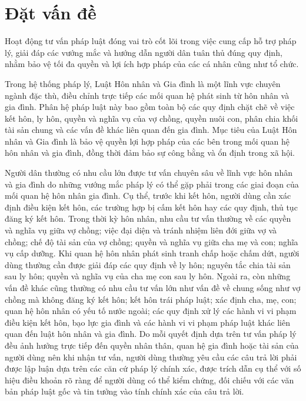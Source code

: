 \documentclass[../DoAn.tex]{subfiles}
\begin{document}
\section{Đặt vấn đề}
\label{section:1.1}


Hoạt động tư vấn pháp luật đóng vai trò cốt lõi trong việc cung cấp hỗ trợ pháp lý, giải đáp các vướng mắc và hướng dẫn người dân tuân thủ đúng quy định, nhằm bảo vệ tối đa quyền và lợi ích hợp pháp của các cá nhân cũng như tổ chức.


Trong hệ thống pháp lý, Luật Hôn nhân và Gia đình là một lĩnh vực chuyên ngành đặc thù, điều chỉnh trực tiếp các mối quan hệ phát sinh từ hôn nhân và gia đình. Phân hệ pháp luật này bao gồm toàn bộ các quy định chặt chẽ về việc kết hôn, ly hôn, quyền và nghĩa vụ của vợ chồng, quyền nuôi con, phân chia khối tài sản chung và các vấn đề khác liên quan đến gia đình. Mục tiêu của Luật Hôn nhân và Gia đình là bảo vệ quyền lợi hợp pháp của các bên trong mối quan hệ hôn nhân và gia đình, đồng thời đảm bảo sự công bằng và ổn định trong xã hội.


Người dân thường có nhu cầu lớn được tư vấn chuyên sâu về lĩnh vực hôn nhân và gia đình do những vướng mắc pháp lý có thể gặp phải trong các giai đoạn của mối quan hệ hôn nhân gia đình. Cụ thể, trước khi kết hôn, người dùng cần xác định điều kiện kết hôn, các trường hợp bị cấm kết hôn hay các quy định, thủ tục đăng ký kết hôn. Trong thời kỳ hôn nhân, nhu cầu tư vấn thường về các quyền và nghĩa vụ giữa vợ chồng; việc đại diện và tránh nhiệm liên đới giữa vợ và chồng; chế độ tài sản của vợ chồng; quyền và nghĩa vụ giữa cha mẹ và con; nghĩa vụ cấp dưỡng. Khi quan hệ hôn nhân phát sinh tranh chấp hoặc chấm dứt, người dùng thường cần được giải đáp các quy định về ly hôn; nguyên tắc chia tài sản sau ly hôn; quyền và nghĩa vụ của cha mẹ con sau ly hôn. Ngoài ra, còn những vấn đề khác cũng thường có nhu cầu tư vấn lớn như vấn đề về chung sống như vợ chồng mà không đăng ký kết hôn; kết hôn trái pháp luật; xác định cha, mẹ, con; quan hệ hôn nhân có yếu tố nước ngoài; các quy định xử lý các hành vi vi phạm điều kiện kết hôn, bạo lực gia đình và các hành vi vi phạm pháp luật khác liên quan đến luật hôn nhân và gia đình. Do mỗi quyết định dựa trên tư vấn pháp lý đều ảnh hưởng trực tiếp đến quyền nhân thân, quan hệ gia đình hoặc tài sản của người dùng nên khi nhận tư vấn, người dùng thường yêu cầu các câu trả lời phải được lập luận dựa trên các căn cứ pháp lý chính xác, được trích dẫn cụ thể với số hiệu điều khoản rõ ràng để người dùng có thể kiểm chứng, đối chiếu với các văn bản pháp luật gốc và tin tưởng vào tính chính xác của câu trả lời.
\end{document}
